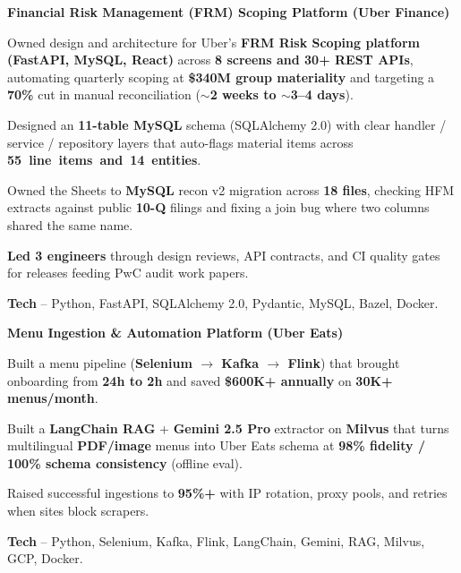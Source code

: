 \textcolor{Project}{\textbf{Financial Risk Management (FRM) Scoping Platform (Uber Finance)}}
\vspace{-1ex}
\begin{zitemize}
    \item Owned design and architecture for Uber's \textbf{FRM Risk Scoping platform (FastAPI, MySQL, React)} across \textbf{8 screens and 30+ REST APIs}, automating quarterly scoping at \textbf{\$340M group materiality} and targeting a \textbf{70\%} cut in manual reconciliation (\textbf{$\sim$2 weeks to $\sim$3--4 days}).
    \item Designed an \textbf{11-table MySQL} schema (SQLAlchemy 2.0) with clear handler / service / repository layers that auto-flags material items across \mbox{\textbf{55 line items and 14 entities}}.
    \item Owned the Sheets to \textbf{MySQL} recon v2 migration across \textbf{18 files}, checking HFM extracts against public \textbf{10-Q} filings and fixing a join bug where two columns shared the same name.
    \item \textbf{Led 3 engineers} through design reviews, API contracts, and CI quality gates for releases feeding PwC audit work papers.
    \item \textbf{Tech} -- Python, FastAPI, SQLAlchemy 2.0, Pydantic, MySQL, Bazel, Docker.
\end{zitemize}
\vspace{0.3ex}

\textcolor{Project}{\textbf{Menu Ingestion \& Automation Platform (Uber Eats)}}
\vspace{-1ex}
\begin{zitemize}
    \item Built a menu pipeline (\textbf{Selenium $\rightarrow$ Kafka $\rightarrow$ Flink}) that brought onboarding from \textbf{24h to 2h} and saved \textbf{\$600K+ annually} on \textbf{30K+ menus/month}.
    \item Built a \textbf{LangChain RAG} + \textbf{Gemini 2.5 Pro} extractor on \textbf{Milvus} that turns multilingual \textbf{PDF/image} menus into Uber Eats schema at \textbf{98\% fidelity / 100\% schema consistency} (offline eval).
    \item Raised successful ingestions to \textbf{95\%+} with IP rotation, proxy pools, and retries when sites block scrapers.
    \item \textbf{Tech} -- Python, Selenium, Kafka, Flink, LangChain, Gemini, RAG, Milvus, GCP, Docker.
\end{zitemize}
\vspace{0.15ex}

